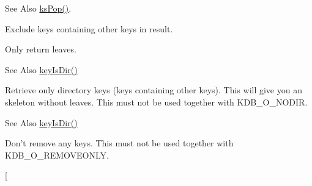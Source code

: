 \begin{Desc}
\begin{description}
\begin{DoxySeeAlso}{See Also}
\hyperlink{group__keyset_gae42530b04defb772059de0600159cf69}{ks\-Pop()}. 
\end{DoxySeeAlso}
\item[{\em 
\hypertarget{group__keyset_gga98a3d6a4016c9dad9cbd1a99a9c2a45aa1a70738b2126badb8db7b012c8a1c610}{K\-D\-B\-\_\-\-O\-\_\-\-N\-O\-D\-I\-R}\label{group__keyset_gga98a3d6a4016c9dad9cbd1a99a9c2a45aa1a70738b2126badb8db7b012c8a1c610}
}]Exclude keys containing other keys in result.

Only return leaves.

\begin{DoxySeeAlso}{See Also}
\hyperlink{group__keytest_gac0a10c602d52a35f81347e8a32312017}{key\-Is\-Dir()} 
\end{DoxySeeAlso}
\item[{\em 
\hypertarget{group__keyset_gga98a3d6a4016c9dad9cbd1a99a9c2a45aa131e99d60253d0b887a1e5886f8aa96c}{K\-D\-B\-\_\-\-O\-\_\-\-D\-I\-R\-O\-N\-L\-Y}\label{group__keyset_gga98a3d6a4016c9dad9cbd1a99a9c2a45aa131e99d60253d0b887a1e5886f8aa96c}
}]Retrieve only directory keys (keys containing other keys). This will give you an skeleton without leaves. This must not be used together with K\-D\-B\-\_\-\-O\-\_\-\-N\-O\-D\-I\-R. \begin{DoxySeeAlso}{See Also}
\hyperlink{group__keytest_gac0a10c602d52a35f81347e8a32312017}{key\-Is\-Dir()} 
\end{DoxySeeAlso}
\item[{\em 
\hypertarget{group__keyset_gga98a3d6a4016c9dad9cbd1a99a9c2a45aa7649f575c2eb0adeaf2c9173ae16e0e6}{K\-D\-B\-\_\-\-O\-\_\-\-N\-O\-R\-E\-M\-O\-V\-E}\label{group__keyset_gga98a3d6a4016c9dad9cbd1a99a9c2a45aa7649f575c2eb0adeaf2c9173ae16e0e6}
}]Don't remove any keys. This must not be used together with K\-D\-B\-\_\-\-O\-\_\-\-R\-E\-M\-O\-V\-E\-O\-N\-L\-Y. \item[{\em 
}
\end{description}
\end{Desc}
